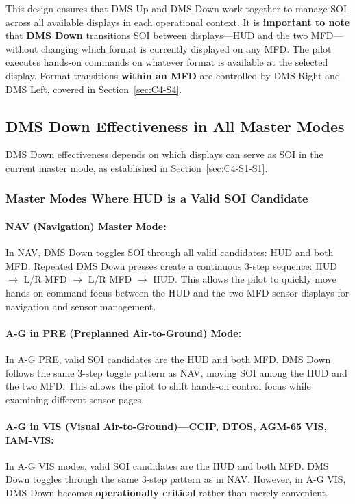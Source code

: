 \documentclass[11pt, a4paper, twoside]{report}
\begin{document}
This design ensures that DMS Up and DMS Down work together to manage SOI across all available displays in each operational context. It is \textbf{important to note} that \textbf{DMS Down} transitions SOI between displays—HUD and the two MFD—without changing which format is currently displayed on any MFD. The pilot executes hands-on commands on whatever format is available at the selected display. Format transitions \textbf{within an MFD} are controlled by DMS Right and DMS Left, covered in Section~\ref{sec:C4-S4}.

\subsection{DMS Down Effectiveness in All Master Modes}
\label{sec:C4-S3-S1}
DMS Down effectiveness depends on which displays can serve as SOI in the current master 
mode, as established in Section~\ref{sec:C4-S1-S1}.

\subsubsection{Master Modes Where HUD is a Valid SOI Candidate}
\label{sec:C4-S3-S1-S1}

\paragraph{NAV (Navigation) Master Mode:}
In NAV, DMS Down toggles SOI through all valid candidates: HUD and both MFD. 
Repeated DMS Down presses create a continuous 3-step sequence: HUD 
$\rightarrow$ L/R MFD $\rightarrow$ L/R MFD $\rightarrow$ HUD. This allows the pilot to quickly move hands-on command focus between the HUD and the two MFD sensor displays for navigation and sensor management.

\paragraph{A-G in PRE (Preplanned Air-to-Ground) Mode:}
In A-G PRE, valid SOI candidates are the HUD and both MFD. DMS Down follows the 
same 3-step toggle pattern as NAV, moving SOI among the HUD and the two MFD. This allows the pilot to shift hands-on control focus while examining different sensor pages.

\paragraph{A-G in VIS (Visual Air-to-Ground)---CCIP, DTOS, AGM-65 VIS, IAM-VIS:}
In A-G VIS modes, valid SOI candidates are the HUD and both MFD. DMS Down toggles through the same 3-step pattern as in NAV. However, in A-G VIS, DMS Down becomes \textbf{operationally critical} rather than merely convenient.
\end{document}
